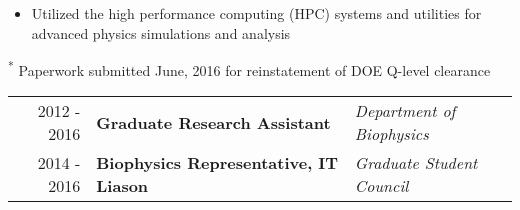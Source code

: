 \begin{center}
\begin{minipage}{\textwidth}
\begin{itemize}
	    \item Utilized the high performance computing (HPC) systems and utilities for advanced physics simulations and analysis
	\end{itemize}
\end{minipage}
    \end{center}

\begin{minipage}{\textwidth}
\begin{center}
\footnotesize \textsuperscript{*} Paperwork submitted June, 2016 for reinstatement of DOE Q-level clearance
\end{center}
\end{minipage}


\begin{minipage}{\textwidth}
	\begin{tabular}{r|ll}
		2012 - 2016 & \textbf{Graduate Research Assistant} & \textit{Department of Biophysics}  \\
		2014 - 2016 & \textbf{Biophysics Representative, IT Liason} & \textit{Graduate Student Council}  \\
	\end{tabular}
\end{minipage}

